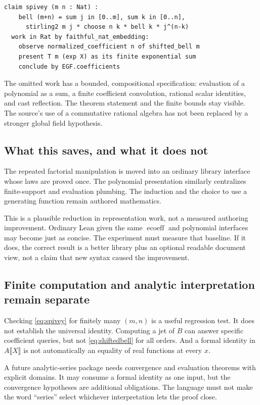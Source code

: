 \documentclass[11pt,a4paper]{article}
\newcommand{\ecoeff}{\operatorname{ecoeff}}
\theoremstyle{definition}
\begin{document}
\begin{lstlisting}
claim spivey (m n : Nat) :
    bell (m+n) = sum j in [0..m], sum k in [0..n],
      stirling2 m j * choose n k * bell k * j^(n-k)
  work in Rat by faithful_nat_embedding:
    observe normalized_coefficient n of shifted_bell m
    present T m (exp X) as its finite exponential sum
    conclude by EGF.coefficients
\end{lstlisting}

The omitted work has a bounded, compositional specification: evaluation of a
polynomial as a sum, a finite coefficient convolution, rational scalar identities,
and cast reflection. The theorem statement and the finite bounds stay visible.
The source's use of a commutative rational algebra has not been replaced by a
stronger global field hypothesis.

\subsection{What this saves, and what it does not}
The repeated factorial manipulation is moved into an ordinary library interface
whose laws are proved once. The polynomial presentation similarly centralizes
finite-support and evaluation plumbing. The induction and the choice to use a
generating function remain authored mathematics.

This is a plausible reduction in representation work, not a measured authoring
improvement. Ordinary Lean given the same \(\ecoeff\) and polynomial interfaces
may become just as concise. The experiment must measure that baseline. If it
does, the correct result is a better library plus an optional readable document
view, not a claim that new syntax caused the improvement.

\subsection{Finite computation and analytic interpretation remain separate}
Checking \eqref{eq:spivey} for finitely many \((m,n)\) is a useful regression test.
It does not establish the universal identity. Computing a jet of \(B\) can answer
specific coefficient queries, but not \eqref{eq:shiftedbell} for all orders. And
a formal identity in \(A\llbracket X\rrbracket\) is not automatically an equality
of real functions at every \(x\).

A future analytic-series package needs convergence and evaluation theorems with
explicit domains. It may consume a formal identity as one input, but the
convergence hypotheses are additional obligations. The language must not make
the word ``series'' select whichever interpretation lets the proof close.
\end{document}
